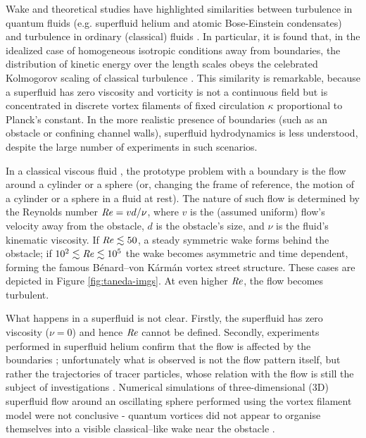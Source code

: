 \begin{chapter}{\label{cha:wake}Wake}
and theoretical studies \cite{Lvov}
have highlighted similarities between turbulence in quantum
fluids (e.g. superfluid helium and atomic Bose-Einstein condensates)
and turbulence in ordinary (classical) fluids \cite{Frisch}.
In particular, it is found that, in
the idealized case of homogeneous isotropic conditions away from
boundaries, the distribution of kinetic energy over the 
length scales obeys the celebrated Kolmogorov scaling of 
classical turbulence \cite{barenghi}. This similarity is remarkable,
because a superfluid has zero viscosity and vorticity is not a continuous
field but is concentrated in discrete vortex filaments of fixed 
circulation $\kappa$ proportional to Planck's constant. 
In the more realistic
presence of boundaries (such as an obstacle or confining channel
walls), superfluid hydrodynamics
is less understood, despite the large number of experiments in such scenarios. 

In a classical viscous fluid \cite{Frisch}, the prototype problem with
a boundary is the flow 
around a cylinder or a sphere (or, changing the frame of reference, 
the motion of a cylinder or a sphere in a fluid at rest).
The nature of such flow is determined by the Reynolds 
number $\mbox{\ensuremath{\mathit{Re}}} = vd/\nu$, where $v$ is the (assumed uniform)
flow's velocity away from the obstacle, $d$ is the obstacle's size,
and $\nu$ is the fluid's
kinematic viscosity. If $\mbox{\ensuremath{\mathit{Re}}}\lesssim50$, a steady symmetric 
wake forms behind the obstacle; if $10^2\lesssim\mbox{\ensuremath{\mathit{Re}}}\lesssim10^5$ the wake 
becomes asymmetric and time dependent, forming the famous 
B\'enard--von K\'arm\'an vortex street structure.  These cases are depicted in Figure \ref{fig:taneda-imgs}.  At even higher $\mbox{\ensuremath{\mathit{Re}}}$,
the flow becomes turbulent. 

What happens in a superfluid is not clear. Firstly, the superfluid has
zero viscosity ($\nu=0$) and hence $\mbox{\ensuremath{\mathit{Re}}}$ cannot be defined. Secondly,
experiments performed in superfluid helium confirm that the flow is affected
by the boundaries \cite{VanSciver1999,VanSciver2005}; unfortunately 
what is observed is not the flow pattern itself, but rather the
trajectories of tracer particles, whose
relation with the flow is still the subject
of investigations \cite{sergeev09}. Numerical simulations of three-dimensional (3D) superfluid flow around
an oscillating sphere performed using the vortex filament model
were not conclusive - 
quantum vortices did not appear to organise themselves
into a visible classical--like wake near the obstacle \cite{Hanninen,Fujiyama,goto08}.


\end{chapter}
